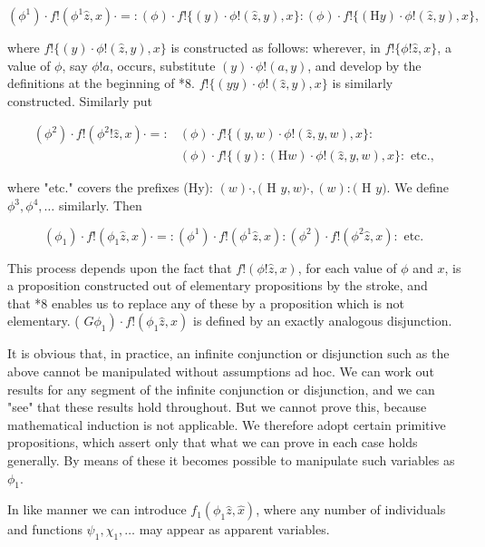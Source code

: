 \documentclass[10pt]{article}
\begin{document}
$$
\left(\phi^{1}\right) \cdot f!\left(\phi^{1} \hat{z}, x\right) \cdot=:(\phi) \cdot f!\{(y) \cdot \phi!(\hat{z}, y), x\}:(\phi) \cdot f!\{(\mathrm{H} y) \cdot \phi!(\hat{z}, y), x\},
$$

where $f!\{(y) \cdot \phi!(\hat{z}, y), x\}$ is constructed as follows: wherever, in $f!\{\phi!\hat{z}, x\}$, a value of $\phi$, say $\phi!a$, occurs, substitute $(y) \cdot \phi!(a, y)$, and develop by the definitions at the beginning of *8. $f!\{(y y) \cdot \phi!(\hat{z}, y), x\}$ is similarly constructed. Similarly put

$$
\begin{aligned}
\left(\phi^{2}\right) \cdot f!\left(\phi^{2}!\hat{z}, x\right) \cdot=: & (\phi) \cdot f!\{(y, w) \cdot \phi!(\hat{z}, y, w), x\}: \\
& (\phi) \cdot f!\{(y):(\mathrm{H} w) \cdot \phi!(\hat{z}, y, w), x\}: \text { etc., }
\end{aligned}
$$

where "etc." covers the prefixes (Hy): $(w) \cdot,($ H $y, w) \cdot,(w):($ H $y)$. We define $\phi^{3}, \phi^{4}, \ldots$ similarly. Then

$$
\left(\phi_{1}\right) \cdot f!\left(\phi_{1} \hat{z}, x\right) \cdot=:\left(\phi^{1}\right) \cdot f!\left(\phi^{1} \hat{z}, x\right):\left(\phi^{2}\right) \cdot f!\left(\phi^{2} \hat{z}, x\right): \text { etc. }
$$

This process depends upon the fact that $f!(\phi!\hat{z}, x)$, for each value of $\phi$ and $x$, is a proposition constructed out of elementary propositions by the stroke, and\\
that *8 enables us to replace any of these by a proposition which is not elementary. ( $\left.G \phi_{1}\right) \cdot f!\left(\phi_{1} \hat{z}, x\right)$ is defined by an exactly analogous disjunction.

It is obvious that, in practice, an infinite conjunction or disjunction such as the above cannot be manipulated without assumptions ad hoc. We can work out results for any segment of the infinite conjunction or disjunction, and we can "see" that these results hold throughout. But we cannot prove this, because mathematical induction is not applicable. We therefore adopt certain primitive propositions, which assert only that what we can prove in each case holds generally. By means of these it becomes possible to manipulate such variables as $\phi_{1}$.

In like manner we can introduce $f_{1}\left(\phi_{1} \hat{z}, \hat{x}\right)$, where any number of individuals and functions $\psi_{1}, \chi_{1}, \ldots$ may appear as apparent variables.
\end{document}
